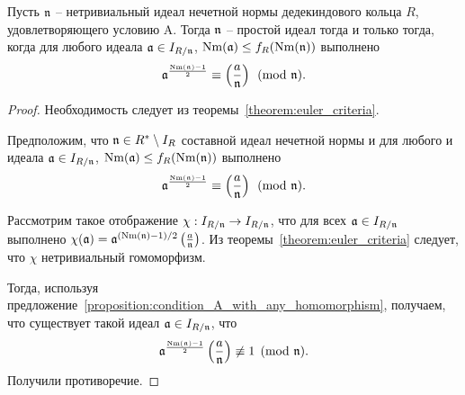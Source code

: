 \documentclass[_00_dissertation.tex]{subfiles}
\begin{document}
\begin{theorem}\label{theorem:euler_criteria_deterministic}
    Пусть $\mathfrak{n}$ -- нетривиальный идеал нечетной нормы дедекиндового кольца $R$, удовлетворяющего условию A.
    Тогда $\mathfrak{n}$ -- простой идеал тогда и только тогда, когда для любого идеала $\mathfrak{a} \in I_{R/\mathfrak{n}}$, $\textrm{Nm}(\mathfrak{a}) \le f_R(\textrm{Nm}(\mathfrak{n}))$ выполнено
    \begin{equation*}
        \mathfrak{a}^{\frac{\textrm{Nm}(\mathfrak{n}) - 1}{2}} \equiv \left(\frac{a}{\mathfrak{n}}\right) \pmod{\mathfrak{n}}.
    \end{equation*}
\end{theorem}
\begin{proof}
    Необходимость следует из теоремы~\ref{theorem:euler_criteria}.
    
    Предположим, что $\mathfrak{n} \in R^{*} \setminus I_{R}$ составной идеал нечетной нормы и для любого и идеала $\mathfrak{a} \in I_{R/\mathfrak{n}}$, $\textrm{Nm}(\mathfrak{a}) \le f_R(\textrm{Nm}(\mathfrak{n}))$ выполнено
    \begin{equation*}
        \mathfrak{a}^{\frac{\textrm{Nm}(\mathfrak{n}) - 1}{2}} \equiv \left(\frac{a}{\mathfrak{n}}\right) \pmod{\mathfrak{n}}.
    \end{equation*}
    
    Рассмотрим такое отображение $\chi: I_{R/\mathfrak{n}} \to I_{R/\mathfrak{n}}$, что для всех $\mathfrak{a} \in I_{R/\mathfrak{n}}$ выполнено $\chi(\mathfrak{a}) = \mathfrak{a}^{(\textrm{Nm}(\mathfrak{n}) - 1)/2}\left(\frac{a}{\mathfrak{n}}\right)$.
    Из теоремы~\ref{theorem:euler_criteria} следует, что $\chi$ нетривиальный гомоморфизм.
    
    Тогда, используя предложение~\ref{proposition:condition_A_with_any_homomorphism}, получаем, что существует такой идеал $\mathfrak{a} \in I_{R/\mathfrak{n}}$, что
    \begin{equation*}
        \mathfrak{a}^{\frac{\textrm{Nm}(\mathfrak{n}) - 1}{2}} \left(\frac{a}{\mathfrak{n}}\right) \not\equiv 1 \pmod{\mathfrak{n}}.
    \end{equation*}
    Получили противоречие.
\end{proof}
\end{document}
